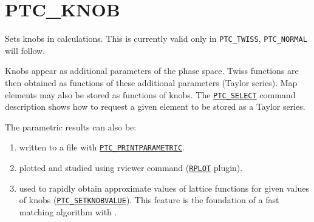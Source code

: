 


\section{PTC\_KNOB}
\label{sec:ptc_knob}


Sets knobs in \ptc calculations. This is currently valid only in
{\tt  PTC\_TWISS}, {\tt PTC\_NORMAL} will follow. 

Knobs appear as additional parameters of the phase space. Twiss
functions are then obtained as functions of these additional parameters
(Taylor series).  
Map elements may also be stored as functions of knobs. 
The \hyperref[sec:ptc_select]{\tt PTC\_SELECT} command 
description shows how to request a given element to be stored as a 
Taylor series.  

The parametric results can also be: 
\begin{enumerate}
   \item  written to a file with
     \hyperref[ptc_printparametric]{\tt PTC\_PRINTPARAMETRIC}. 
   \item  plotted and studied using rviewer command
     (\hyperref[sec:rplot]{\tt RPLOT} plugin). 
   \item  used to rapidly obtain approximate values of lattice
     functions for given values of knobs
     (\hyperref[sec:ptc_setknobvalue]{\tt PTC\_SETKNOBVALUE}). This
     feature is the foundation of a fast matching algorithm with \ptc.      
\end{enumerate}


